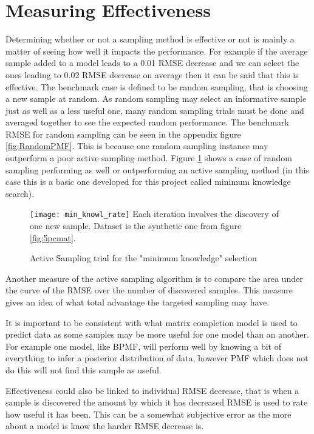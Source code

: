 \section{Measuring Effectiveness}
Determining whether or not a sampling method is effective or not is mainly a matter of seeing how well it impacts the performance. For example if the average sample added to a model leads to a 0.01 RMSE decrease and we can select the ones leading to 0.02 RMSE decrease on average then it can be said that this is effective. The benchmark case is defined to be random sampling, that is choosing a new sample at random. As random sampling may select an informative sample just as well as a less useful one, many random sampling trials must be done and averaged together to see the expected random performance. The benchmark RMSE for random sampling can be seen in the appendix figure \ref{fig:RandomPMF}. This is because one random sampling instance may outperform a poor active sampling method. Figure \ref{fig:al_minknowl} shows a case of random sampling performing as well or outperforming an active sampling method (in this case this is a basic one developed for this project called minimum knowledge search).

\begin{figure}[!htbp]
  \begin{center}
    \texttt{[image: min\_knowl\_rate]}
    Each iteration involves the discovery of one new sample. Dataset is the synthetic one from figure \ref{fig:5pcmat}.
    \caption{Active Sampling trial for the "minimum knowledge" selection}
    \label{fig:al_minknowl}
  \end{center}
\end{figure}

Another measure of the active sampling algorithm is to compare the area under the curve of the RMSE over the number of discovered samples. This measure gives an idea of what total advantage the targeted sampling may have.



It is important to be consistent with what matrix completion model is used to predict data as some samples may be more useful for one model than an another. For example one model, like BPMF, will perform well by knowing a bit of everything to infer a posterior distribution of data, however PMF which does not do this will not find this sample as useful.

Effectiveness could also be linked to individual RMSE decrease, that is when a sample is discovered the amount by which it has decreased RMSE is used to rate how useful it has been. This can be a somewhat subjective error as the more about a model is know the harder RMSE decrease is.

